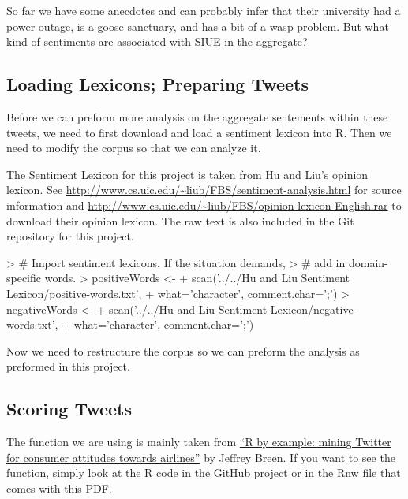 \documentclass[letterpaper, 12pt]{article}
\begin{document}
So far we have some anecdotes and can probably infer that their university had a power outage, is a goose sanctuary, and has a bit of a wasp problem. But what kind of sentiments are associated with SIUE in the aggregate?

\subsection{Loading Lexicons; Preparing Tweets}
Before we can preform more analysis on the aggregate sentements within these tweets, we need to first download and load a sentiment lexicon into R. Then we need to modify the corpus so that we can analyze it.

The Sentiment Lexicon for this project is taken from Hu and Liu's opinion lexicon. See \url{http://www.cs.uic.edu/~liub/FBS/sentiment-analysis.html} for source information and \url{http://www.cs.uic.edu/~liub/FBS/opinion-lexicon-English.rar} to download their opinion lexicon. The raw text is also included in the Git repository for this project.

\begin{Schunk}
\begin{Sinput}
> # Import sentiment lexicons. If the situation demands, 
> # add in domain-specific words.
> positiveWords <- 
+   scan('../../Hu and Liu Sentiment Lexicon/positive-words.txt',
+        what='character', comment.char=';')
> negativeWords <- 
+   scan('../../Hu and Liu Sentiment Lexicon/negative-words.txt',
+        what='character', comment.char=';')
\end{Sinput}
\end{Schunk}

Now we need to restructure the corpus so we can preform the analysis as preformed in this project.

\begin{Schunk}
\end{Schunk}

\subsection{Scoring Tweets}
The function we are using is mainly taken from \href{http://www.slideshare.net/jeffreybreen/r-by-example-mining-twitter-for}{``R by example: mining Twitter for consumer
attitudes towards airlines''} by Jeffrey Breen. If you want to see the function, simply look at the R code in the GitHub project or in the Rnw file that comes with this PDF.
\end{document}
